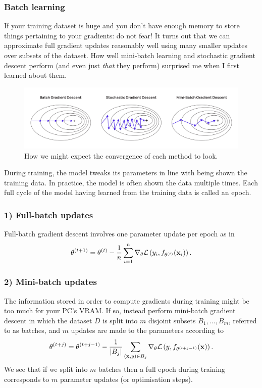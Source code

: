 \documentclass[11pt]{article}
\begin{document}
\subsubsection{Batch learning}
If your training dataset is huge and you don't have enough memory to store things pertaining to your gradients: do not fear! It turns out that we can approximate full gradient updates reasonably well using many smaller updates over subsets of the dataset. How well mini-batch learning and stochastic gradient descent perform (and even just \textit{that} they perform) surprised me when I first learned about them.

\begin{figure}[t]
    \centering
    \includegraphics[width=\columnwidth]{./figures/gradient_descent/gradient_descent_types.png}
    \caption{How we might expect the convergence of each method to look. }
    \label{fig:gradient_descent_types}
\end{figure}

\begin{tcolorbox}[title={\centering\textbf{Epoch terminology}}, colback=myLightBlue, colbacktitle=myDarkBlue, colframe=myDarkBlue, coltitle=white]
    During training, the model tweaks its parameters in line with being shown the training data. In practice, the model is often shown the data multiple times. Each full cycle of the model having learned from the training data is called an epoch.
\end{tcolorbox}

\subsubsection*{1) Full-batch updates}
Full-batch gradient descent involves one parameter update per epoch as in
$$
\theta^{(t+1)}
=
\theta^{(t)}-\frac{1}{n}\sum_{i=1}^n \nabla_{\theta}\mathcal{L}\left(y_i,f_{\theta^{(t)}}(\mathbf{x}_i)\right).
$$

\subsubsection*{2) Mini-batch updates}
The information stored in order to compute gradients during training might be too much for your PC's VRAM. If so, instead perform mini-batch gradient descent in which the dataset $D$ is split into $m$ disjoint subsets $B_1,\dots,B_m$, referred to as batches, and $m$ updates are made to the parameters according to
$$
\theta^{(t+j)}
=
\theta^{(t+j-1)}-\frac{1}{|B_j|}\sum_{(\mathbf{x},y)\in B_j} \nabla_{\theta}\mathcal{L}\left(y,f_{\theta^{(t+j-1)}}(\mathbf{x})\right).
$$
We see that if we split into $m$ batches then a full epoch during training corresponds to $m$ parameter updates (or optimisation steps).
\end{document}
